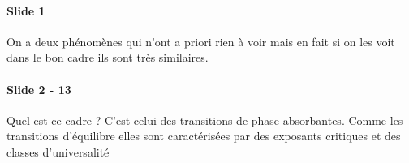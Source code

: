 \documentclass[10pt,a4paper]{article}
\begin{document}
\paragraph{Slide 1} On a deux phénomènes qui n'ont a priori rien à voir mais en fait si on les voit dans le bon cadre ils sont très similaires.

\paragraph{Slide 2 - 13} Quel est ce cadre ? C'est celui des transitions de phase absorbantes. Comme les transitions d'équilibre elles sont caractérisées par des exposants critiques et des classes d'universalité 
\end{document}
